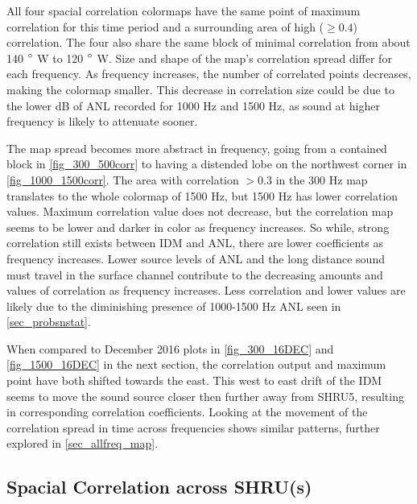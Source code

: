 All four spacial correlation colormaps have the same point of maximum correlation for this time period and a surrounding area of high ($\geq 0.4$) correlation. The four also share the same block of minimal correlation from about 140 $\degree$ W to 120 $\degree$ W. Size and shape of the map's correlation spread differ for each frequency. As frequency increases, the number of correlated points decreases, making the colormap smaller. This decrease in correlation size could be due to the lower dB of ANL recorded for 1000 Hz and 1500 Hz, as  sound at higher frequency is likely to attenuate sooner. 

The map spread becomes more abstract in frequency, going from a contained block in \autoref{fig_300_500corr} to having a distended lobe on the northwest corner in \autoref{fig_1000_1500corr}. The area with correlation $>0.3$ in the 300 Hz map translates to the whole colormap of 1500 Hz, but 1500 Hz has lower correlation values. Maximum correlation value does not decrease, but the correlation map seems to be lower and darker in color as frequency increases. So while, strong correlation still exists between IDM and ANL, there are lower coefficients as frequency increases. Lower source levels of ANL and the long distance sound must travel in the surface channel contribute to the decreasing amounts and values of correlation as frequency increases. Less correlation and lower values are likely due to the diminishing presence of 1000-1500 Hz ANL seen in \autoref{sec_probsnstat}.

When compared to December 2016 plots in \autoref{fig_300_16DEC} and \autoref{fig_1500_16DEC} in the next section, the correlation output and maximum point have both shifted towards the east. This west to east drift of the IDM seems to move the sound source closer then further away from SHRU5, resulting in corresponding correlation coefficients. Looking at the movement of the correlation spread in time across frequencies shows similar patterns, further explored in \autoref{sec_allfreq_map}.


\subsection{Spacial Correlation across SHRU(s)} \label{sec_corr_shru}

